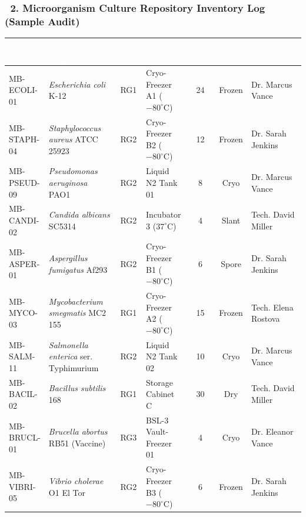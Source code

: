 \documentclass[10pt,a4paper]{scrartcl}
\begin{document}
\vspace{4pt}

\subsubsection*{\textcolor{NavyPrimary}{\faMicroscope\ 2. Microorganism Culture Repository Inventory Log (Sample Audit)}}

\begin{tcolorbox}[auditcard, left=0pt, right=0pt, top=0pt, bottom=0pt]
\small
{}
\begin{tabularx}{\textwidth}{l X c X c c X}
\rowcolor{TableHeadBg}
\textcolor{white}{\textbf{Strain ID}} & \textcolor{white}{\textbf{Microorganism / Species}} & \textcolor{white}{\textbf{Risk}} & \textcolor{white}{\textbf{Storage Location}} & \textcolor{white}{\textbf{Vials}} & \textcolor{white}{\textbf{State}} & \textcolor{white}{\textbf{Authorized Custodian}} \\
\midrule
MB-ECOLI-01 & \textit{Escherichia coli} K-12 & RG1 & Cryo-Freezer A1 ($-80^{\circ}\text{C}$) & 24 & Frozen & Dr. Marcus Vance \\
MB-STAPH-04 & \textit{Staphylococcus aureus} ATCC 25923 & RG2 & Cryo-Freezer B2 ($-80^{\circ}\text{C}$) & 12 & Frozen & Dr. Sarah Jenkins \\
MB-PSEUD-09 & \textit{Pseudomonas aeruginosa} PAO1 & RG2 & Liquid N2 Tank 01 & 8 & Cryo & Dr. Marcus Vance \\
MB-CANDI-02 & \textit{Candida albicans} SC5314 & RG2 & Incubator 3 ($37^{\circ}\text{C}$) & 4 & Slant & Tech. David Miller \\
MB-ASPER-01 & \textit{Aspergillus fumigatus} Af293 & RG2 & Cryo-Freezer B1 ($-80^{\circ}\text{C}$) & 6 & Spore & Dr. Sarah Jenkins \\
MB-MYCO-03 & \textit{Mycobacterium smegmatis} MC2 155 & RG1 & Cryo-Freezer A2 ($-80^{\circ}\text{C}$) & 15 & Frozen & Tech. Elena Rostova \\
MB-SALM-11 & \textit{Salmonella enterica} ser. Typhimurium & RG2 & Liquid N2 Tank 02 & 10 & Cryo & Dr. Marcus Vance \\
MB-BACIL-02 & \textit{Bacillus subtilis} 168 & RG1 & Storage Cabinet C & 30 & Dry & Tech. David Miller \\
MB-BRUCL-01 & \textit{Brucella abortus} RB51 (Vaccine) & RG3 & BSL-3 Vault-Freezer 01 & 4 & Cryo & Dr. Eleanor Vance \\
MB-VIBRI-05 & \textit{Vibrio cholerae} O1 El Tor & RG2 & Cryo-Freezer B3 ($-80^{\circ}\text{C}$) & 6 & Frozen & Dr. Sarah Jenkins \\
\bottomrule
\end{tabularx}
\end{tcolorbox}
\end{document}
